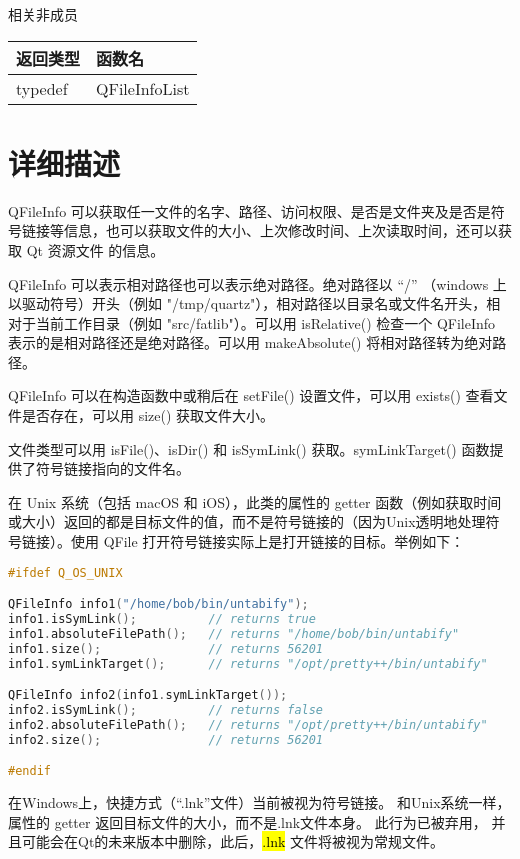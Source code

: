 相关非成员

\begin{tabular}{|l|l|}
\hline
返回类型& 	函数名\\
\hline
typedef &	QFileInfoList\\
\hline
\end{tabular}

\splitLine 

\section{详细描述}

QFileInfo 可以获取任一文件的名字、路径、访问权限、是否是文件夹及是否是符号链接等信息，也可以获取文件的大小、上次修改时间、上次读取时间，还可以获取 Qt 资源文件 的信息。

QFileInfo 可以表示相对路径也可以表示绝对路径。绝对路径以 “/” （windows 上以驱动符号）开头（例如 "/tmp/quartz"），相对路径以目录名或文件名开头，相对于当前工作目录（例如 "src/fatlib"）。可以用 isRelative() 检查一个 QFileInfo 表示的是相对路径还是绝对路径。可以用 makeAbsolute() 将相对路径转为绝对路径。

QFileInfo 可以在构造函数中或稍后在 setFile() 设置文件，可以用 exists() 查看文件是否存在，可以用 size() 获取文件大小。

文件类型可以用 isFile()、isDir() 和 isSymLink() 获取。symLinkTarget() 函数提供了符号链接指向的文件名。

在 Unix 系统（包括 macOS 和 iOS），此类的属性的 getter 函数（例如获取时间或大小）返回的都是目标文件的值，而不是符号链接的（因为Unix透明地处理符号链接）。使用 QFile 打开符号链接实际上是打开链接的目标。举例如下：


\begin{lstlisting}[language=C++]
#ifdef Q_OS_UNIX

QFileInfo info1("/home/bob/bin/untabify");
info1.isSymLink();          // returns true
info1.absoluteFilePath();   // returns "/home/bob/bin/untabify"
info1.size();               // returns 56201
info1.symLinkTarget();      // returns "/opt/pretty++/bin/untabify"

QFileInfo info2(info1.symLinkTarget());
info2.isSymLink();          // returns false
info2.absoluteFilePath();   // returns "/opt/pretty++/bin/untabify"
info2.size();               // returns 56201

#endif
\end{lstlisting}

在Windows上，快捷方式（“.lnk”文件）当前被视为符号链接。 和Unix系统一样，
属性的 getter 返回目标文件的大小，而不是.lnk文件本身。 此行为已被弃用，
并且可能会在Qt的未来版本中删除，此后，\hl{.lnk} 文件将被视为常规文件。

